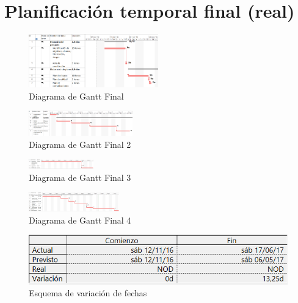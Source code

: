 \documentclass{pclass}
\begin{document}
\section{Planificación temporal final (real)}

\begin{figure}[H]
	\centering
	\includegraphics[angle=270,width=0.5\textwidth]{img/ganttFinal}
	\caption{Diagrama de Gantt Final}
	\label{fig:ganttFinal}
\end{figure} 

\begin{figure}[H]
	\centering
	\includegraphics[angle=270,width=0.4\textwidth]{img/ganttFinal2}
	\caption{Diagrama de Gantt Final 2}
	\label{fig:ganttFinal2}
\end{figure}

\begin{figure}[H]
	\centering
	\includegraphics[angle=270,width=0.25\textwidth]{img/ganttFinal3}
	\caption{Diagrama de Gantt Final 3}
	\label{fig:ganttFinal3}
\end{figure}

\begin{figure}[H]
	\centering
	\includegraphics[angle=270,width=0.35\textwidth]{img/ganttFinal4}
	\caption{Diagrama de Gantt Final 4}
	\label{fig:ganttFinal4}
\end{figure}

\begin{figure}[H]
	\centering
	\includegraphics[width=1\textwidth]{img/variacionFechas}
	\caption{Esquema de variación de fechas}
	\label{fig:variacionFechas}
\end{figure}
\end{document}
